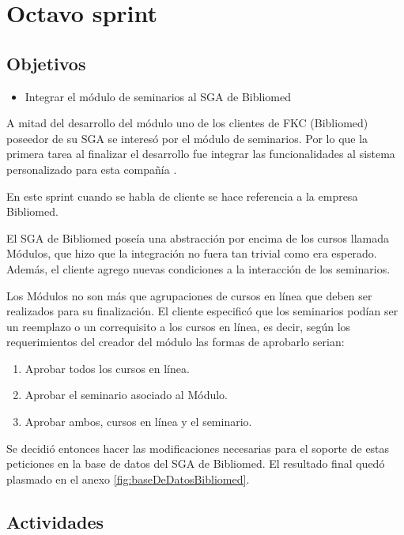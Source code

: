 ﻿\section{Octavo sprint} %
\label{sec:octavo_sprint}

\subsection{Objetivos}

\begin{itemize}
	\item Integrar el módulo de seminarios al SGA de Bibliomed
\end{itemize}

A mitad del desarrollo del módulo uno de los clientes de FKC (Bibliomed) poseedor de su SGA se interesó por el módulo de seminarios. Por lo que la primera tarea al finalizar el desarrollo fue integrar las funcionalidades al sistema personalizado para esta compañía
.

En este sprint cuando se habla de cliente se hace referencia a la empresa Bibliomed.

El SGA de Bibliomed poseía una abstracción por encima de los cursos llamada Módulos, que hizo que la integración no fuera tan trivial como era esperado. Además, el cliente agrego nuevas condiciones a la interacción de los seminarios.

Los Módulos no son más que agrupaciones de cursos en línea que deben ser realizados para su finalización. El cliente especificó que los seminarios podían ser un reemplazo o un correquisito a los cursos en línea, es decir, según los requerimientos del creador del módulo las formas de aprobarlo serian:

\begin{enumerate}
	\item Aprobar todos los cursos en línea.
	\item Aprobar el seminario asociado al Módulo.
	\item Aprobar ambos, cursos en línea y el seminario.
\end{enumerate}

Se decidió entonces hacer las modificaciones necesarias para el soporte de estas peticiones en la base de datos del SGA de Bibliomed. El resultado final quedó plasmado en el anexo \ref{fig:baseDeDatosBibliomed}.

\subsection{Actividades} %
\label{sub:actividades8}

